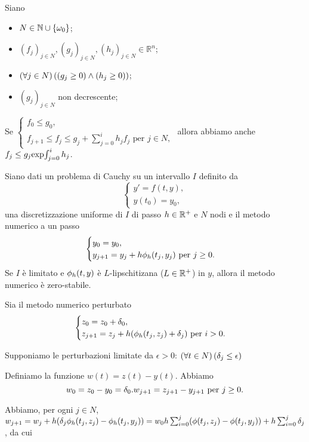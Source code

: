 \begin{Lemma}
	 Siano
	\begin{itemize}
		\item $N \in \mathbb{N} \cup \lbrace \omega_0 \rbrace$;
		\item $(f_j)_{j \in N}, (g_j)_{j \in N}, (h_j)_{j \in N} \in \mathbb{R}^n$;
		\item $\left ( \forall j \in N \right ) \left ( \left ( g_j \geq 0 \right ) \wedge \left ( h_j \geq 0 \right ) \right )$;
		\item $(g_j)_{j \in N}$ non decrescente;
	\end{itemize}
	Se $\begin{cases} f_0 \leq g_0,\\f_{j + 1} \leq f_j \leq g_j + \sum_{j = 0}^i h_j f_j\text{ per }j \in N,\end{cases}$ allora abbiamo anche $f_j \leq g_j \text{exp}{\int_{j = 0}^ih_j}$.
\end{Lemma}
\begin{Theorem}
	Siano dati un problema di Cauchy su un intervallo $I$ definito da
	\[
	\begin{cases}
		y' = f(t,y),\\
		y(t_0) = y_0,
	\end{cases}
	\]
	una discretizzazione uniforme di $I$ di passo $h \in \mathbb{R}^+$ e $N$ nodi e il metodo numerico a un passo
	\[
	\begin{cases}
		y_0 = y_0,\\
		y_{j + 1} = y_j + h\phi_h(t_j,y_j)\text{ per }j \geq 0.
	\end{cases}
	\]
	Se $I$ \`e limitato e $\phi_h(t,y)$ \`e $L$-lipschitizana ($L \in \mathbb{R}^+$) in $y$, allora il metodo numerico \`e zero-stabile.
\end{Theorem}
\Proof Sia il metodo numerico perturbato
\[
\begin{cases}
	z_0 = z_0 + \delta_0,\\
	z_{j + 1} = z_j + h(\phi_h(t_j,z_j) + \delta_j)\text{ per }i > 0.
\end{cases}
\]
\par Supponiamo le perturbazioni limitate da $\epsilon > 0$: $\ForAll{t \in N}{\Perturbation_j \leq \epsilon}$
\par Definiamo la funzione $w(t) = z(t) - y(t)$. Abbiamo
\[
w_0  = z_0 - y_0 = \Perturbation_0.
w_{j + 1} = z_{j + 1} - y_{j + 1}\text{ per }j \geq 0.\\
\]
\par Abbiamo, per ogni $j \in N$, $w_{j + 1} = w_j + \Step (\Perturbation_j \phi_\Step(t_j,z_j) - \phi_\Step(t_j,y_j)) = w_0 \Step \sum_{i = 0}^j(\phi(t_j,z_j) - \phi(t_j,y_j)) + \Step \sum_{i = 0}^j \Perturbation_j$, da cui

